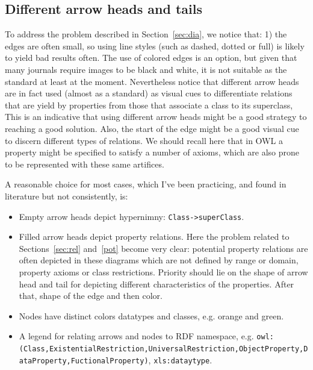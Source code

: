 \documentclass[12pt,fleqn]{article}
\begin{document}
\subsection{Different arrow heads and tails}
To address the problem described in Section~\ref{sec:dia},
we notice that: 1) the edges are often small, so using line styles
(such as dashed, dotted or full) is likely to yield bad results often.
The use of colored edges is an option, but given that many
journals require images to be black and white, it is not suitable
as the standard at least at the moment.
Nevertheless notice that different arrow heads are in fact used (almost as a standard) 
as visual cues
to differentiate relations that are yield by properties from those
that associate a class to its superclass,
This is an indicative that using different arrow heads might
be a good strategy to reaching a good solution.
Also, the start of the edge might be a good visual cue to
discern different types of relations.
We should recall here that in OWL a property might be specified to
satisfy a number of axioms, which are also prone to be represented
with these same artifices.

A reasonable choice for most cases, which I've been practicing,
and found in literature but not consistently,
is:
\begin{itemize}
    \item Empty arrow heads depict hypernimny: \texttt{Class->superClass}.
    \item Filled arrow heads depict property relations.
        Here the problem related to Sections~\ref{sec:rel} and~\ref{pot} become very clear:
        potential property relations are often depicted in these diagrams which are not
        defined by range or domain, property axioms or class restrictions.
        Priority should lie on the shape of arrow head and tail for depicting different characteristics
        of the properties. After that, shape of the edge and then color.
    \item Nodes have distinct colors datatypes and classes, e.g. orange and green.
    \item A legend for relating arrows and nodes to RDF namespace, e.g.
        \texttt{owl:(Class,ExistentialRestriction,UniversalRestriction,ObjectProperty,DataProperty,FuctionalProperty)}, \texttt{xls:dataytype}.
\end{itemize}
\end{document}
